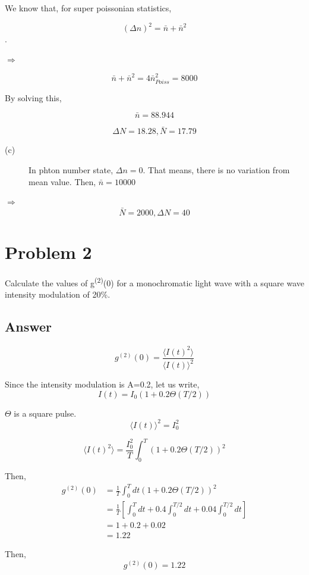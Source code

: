\documentclass[a4paper,11pt]{article}
\begin{document}
We know that, for super poissonian statistics,

$$(\Delta n)^2 = \bar{n} + \bar{n}^2$$.

\(\Rightarrow\)

$$ \bar{n} + \bar{n}^2 = 4 \bar{n}_{Poiss}^2 = 8000$$

By solving this,

$$\bar{n} =88.944$$


$$\Delta N = 18.28, \bar{N} = 17.79$$

\begin{description}
\item[{(c)}] In phton number state, \(\Delta n=0\). That means, there is no variation from mean value. Then, \(\bar{n} = 10000\)
\end{description}

\(\Rightarrow\)
$$\bar{N} = 2000, \Delta N = 40$$

\section*{Problem 2}
\label{sec:org49829e5}
Calculate the values of g\textsuperscript{(2)}(0) for a monochromatic light wave with a square wave intensity modulation of \textpm{} 20\%.

\subsection*{Answer}
\label{sec:org01978a4}

$$g^(2)(0) = \frac{\langle I(t)^2\rangle }{\langle I(t)\rangle ^2}$$

Since the intensity modulation is A=0.2, let us write, $$I(t) = I_0(1+0.2\Theta(T/2))$$

\(\Theta\) is a square pulse.
$$\langle I(t)\rangle ^2 = I_0^2$$

$$\langle I(t)^2\rangle  = \frac{I_0^2}{T} \int_0^{T} (1+0.2\Theta(T/2)) ^2$$

Then,
\begin{equation*}
\begin{split}
g^{(2)}(0) & = \frac{1}{T} \int_0^T dt (1+0.2\Theta(T/2))^2 \\
 & = \frac{1}{T} \left[\int_0^Tdt+0.4\int_0^{T/2}dt+0.04\int_0^{T/2}dt\right] \\
& = 1+0.2+0.02\\
& = 1.22
\end{split}
\end{equation*}


Then, $$g^(2)(0) = 1.22$$
\end{document}
